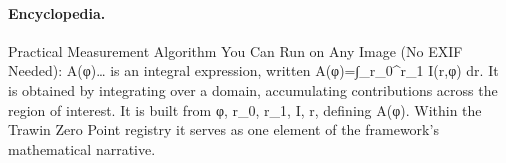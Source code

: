 \paragraph{Encyclopedia.}
Practical Measurement Algorithm You Can Run on Any Image (No EXIF Needed): A(φ)… is an integral expression, written A(φ)=∫\_r\_0\textasciicircum{}r\_1 I(r,φ) dr. It is obtained by integrating over a domain, accumulating contributions across the region of interest. It is built from φ, r\_0, r\_1, I, r, defining A(φ). Within the Trawin Zero Point registry it serves as one element of the framework's mathematical narrative.
